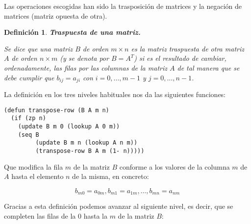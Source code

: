 \documentclass[a4paper,10pt]{article}
\newtheorem{defi}{{Definición}}
\begin{document}
\par \vspace{10pt}		

Las operaciones escogidas han sido la trasposición de matrices y la negación de matrices (matriz opuesta de otra).

\par \vspace{12pt}		

\begin{defi} \textbf{Traspuesta de una matriz.}\vspace{8pt}\par
Se dice que una matriz $B$ de orden $m \times n$ es la matriz \emph{traspuesta} de otra matriz $A$ de orden $n \times m$ (y se denota por $B = A^T$) si es el resultado de cambiar, ordenadamente, las filas por las columnas de la matriz $A$ de tal manera que se debe cumplir que $b_{ij} = a_{ji}$ con $i = 0, \dots, m-1$ y $j = 0, \dots, n-1$.
\end{defi}

\par \vspace{10pt}

La definición en los tres niveles habituales nos da las siguientes funciones:

\begin{lstlisting}[language=clips]
(defun transpose-row (B A m n)
  (if (zp n)
    (update B m 0 (lookup A 0 m))
    (seq B
         (update B m n (lookup A n m))
         (transpose-row B A m (1- n)))))
\end{lstlisting}

\par \vspace{10pt}

Que modifica la fila $m$ de la matriz $B$ conforme a los valores de la columna $m$ de $A$ hasta el elemento $n$ de la misma, en concreto:

\par \vspace{10pt}	

$$
b_{m0} = a_{0m},b_{m1} = a_{1m},\dots,b_{mn} = a_{nm}
$$

\par \vspace{10pt}	

Gracias a esta definición podemos avanzar al siguiente nivel, es decir, que se completen las filas de la 0 hasta la $m$ de la matriz $B$:

\par \vspace{10pt}	
\end{document}
